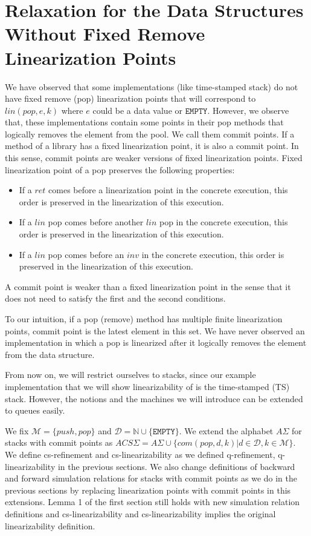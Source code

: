 \section{Relaxation for the Data Structures Without Fixed Remove Linearization Points}
We have observed that some implementations (like time-stamped stack) do not have fixed remove (pop) linearization points that will correspond to $lin(pop,e,k)$ where $e$ could be a data value or $\texttt{EMPTY}$. However, we observe that, these implementations contain some points in their pop methods that logically removes the element from the pool. We call them commit points. If a method of a library has a fixed linearization  point, it is also a commit point. In this sense, commit points are weaker versions of fixed linearization points. Fixed linearization point of a pop preserves the following properties:
\begin{itemize}
\item If a $ret$ comes before a linearization point in the concrete execution, this order is preserved in the linearization of this execution.
\item If a $lin$ pop comes before another $lin$ pop in the concrete execution, this order is preserved in the linearization of this execution.
\item If a $lin$ pop comes before an $inv$ in the concrete execution, this order is preserved in the linearization of this execution. 
\end{itemize} 
A commit point is weaker than a fixed linearization point in the sense that it does not need to satisfy the first and the second conditions. 

To our intuition, if a pop (remove) method has multiple finite linearization points, commit point is the latest element in this set. We have never observed an implementation in which a pop is linearized after it logically removes the element from the data structure. 

From now on, we will restrict ourselves to stacks, since our example implementation that we will show linearizability of is the time-stamped (TS) stack. However, the notions and the machines we will introduce can be extended to queues easily. 

We fix $\mathcal{M} = \{push, pop\}$ and $\mathcal{D} = \mathbb{N} \cup \{\texttt{EMPTY}\}$. We extend the alphabet $A\Sigma$ for stacks with commit points as $ACS\Sigma = A\Sigma \cup \{com(pop,d,k)|d \in \mathcal{D}, k \in \mathcal{M}\}$. We define cs-refinement and cs-linearizability as we defined q-refinement, q-linearizability in the previous sections. We also change definitions of backward and forward simulation relations for stacks with commit points as we do in the previous sections by replacing linearization points with commit points in this extensions. Lemma 1 of the first section still holds with new simulation relation definitions and cs-linearizability and cs-linearizability implies the original linearizability definition. 

